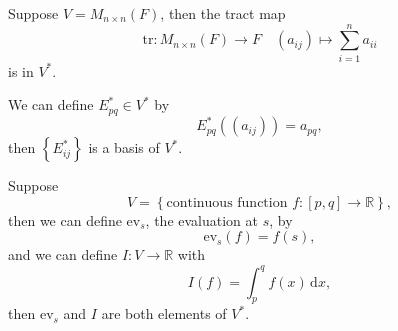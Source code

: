 \begin{eg}
    Suppose \(V = M_{n \times n}(F)\), then the tract map 
    \[
        \mathrm{tr}: M_{n \times n}(F) \to F \quad (a_{ij}) \mapsto \sum_{i=1}^n a_{ii}  
    \] is in \(V^*\). 
\end{eg}

\begin{eg}
    We can define \(E_{pq}^* \in V^*\) by 
    \[
        E_{pq}^*((a_{ij})) = a_{pq},
    \] then \(\left\{ E_{ij}^* \right\} \) is a basis of \(V^*\).   
\end{eg}

\begin{eg}
    Suppose
    \[
        V = \left\{ \text{continuous function }f: [p, q] \to \mathbb{R}  \right\}, 
    \] then we can define \(\mathrm{ev}_s \), the evaluation at \(s\), by 
    \[
        \mathrm{ev}_s(f) = f(s),
    \] and we can define \(I: V \to \mathbb{R} \) with 
    \[
        I(f) = \int_p^q f(x) \, \mathrm{d} x, 
    \] then \(\mathrm{ev}_s \) and \(I\) are both elements of \(V^*\).   
\end{eg}